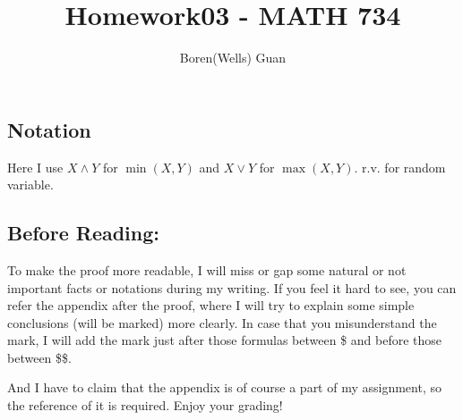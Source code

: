 \documentclass[lang=en,11pt,a4paper,citestyle =authoryear]{elegantpaper}
\title{Homework03 - MATH 734}
\author{Boren(Wells) Guan}
\begin{document}
\maketitle

\subsection*{Notation}
Here I use $X \wedge Y$ for $\min(X,Y)$ and $X\vee Y$ for $\max(X,Y)$. r.v. for random variable.

\subsection*{Before Reading:}\par
To make the proof more readable, I will miss or gap some natural or not important facts or notations during my writing. If you feel it hard to see, you can refer the appendix after the proof, where I will try to explain some simple conclusions (will be marked) more clearly. In case that you misunderstand the mark, I will add the mark just after those formulas between \$ and before those between \$\$.\par
And I have to claim that the appendix is of course a part of my assignment, so the reference of it is required. Enjoy your grading!
\end{document}
